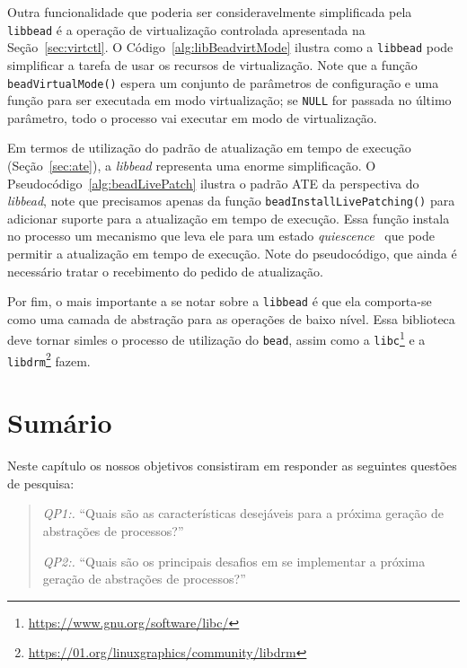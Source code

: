 

Outra funcionalidade que poderia ser consideravelmente simplificada pela
\texttt{libbead} é a operação de virtualização controlada apresentada na
Seção~\ref{sec:virtctl}. O Código~\ref{alg:libBeadvirtMode} ilustra como a
\texttt{libbead} pode simplificar a tarefa de usar os recursos de
virtualização. Note que a função \texttt{beadVirtualMode()} espera um conjunto
de parâmetros de configuração e uma função para ser executada em modo
virtualização; se \texttt{NULL} for passada no último parâmetro, todo o
processo vai executar em modo de virtualização.



Em termos de utilização do padrão de atualização em tempo de execução
(Seção~\ref{sec:ate}), a \emph{libbead} representa uma enorme simplificação. O
Pseudocódigo~\ref{alg:beadLivePatch} ilustra o padrão ATE da perspectiva do
\emph{libbead}, note que precisamos apenas da função
\texttt{beadInstallLivePatching()} para adicionar suporte para a atualização em
tempo de execução. Essa função instala no processo um mecanismo que leva ele
para um estado \emph{quiescence}~\citep{quiescence} que pode permitir a
atualização em tempo de execução. Note do pseudocódigo, que ainda é necessário
tratar o recebimento do pedido de atualização.



Por fim, o mais importante a se notar sobre a \texttt{libbead} é que ela
comporta-se como uma camada de abstração para as operações de baixo nível. Essa
biblioteca deve tornar simles o processo de utilização do \texttt{bead}, assim
como a \texttt{libc}\footnote{\url{https://www.gnu.org/software/libc/}} e a
\texttt{libdrm}\footnote{\url{https://01.org/linuxgraphics/community/libdrm}}
fazem.

\section{Sumário}

Neste capítulo os nossos objetivos consistiram em responder as seguintes
questões de pesquisa:

\begin{quote}
 \item \textit{QP1:.} ``Quais são as características desejáveis para a próxima geração de abstrações de processos?''
 \item \textit{QP2:.} ``Quais são os principais desafios em se implementar a próxima geração de abstrações de processos?''
\end{quote}

